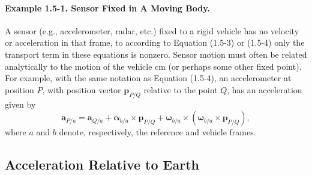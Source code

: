 \paragraph{Example 1.5-1. Sensor Fixed in A Moving Body.} A sensor (e.g., accelerometer, radar, etc.) fixed to a rigid vehicle has no velocity or acceleration in that frame, to according to Equation (1.5-3) or (1.5-4) only the transport term in these equations is nonzero. Sensor motion must often be related analytically to the motion of the vehicle cm (or perhaps some other fixed point). For example, with the same notation as Equation (1.5-4), an accelerometer at position \(P\), with position vector \(\mathbf{p}_{P/Q}\) relative to the point \(Q\), has an acceleration given by
\begin{equation*}
    {\mathbf{a}_{P/a}} = {\mathbf{a}_{Q/a}} + {\mathbf{\alpha}_{b/a}}\!\times\!{\mathbf{p}_{P/Q}} + {\mathbf{\omega}_{b/a}}\!\times\!\left({\mathbf{\omega}_{b/a}}\!\times\!{\mathbf{p}_{P/Q}}\right),
\end{equation*}
where \(a\) and \(b\) denote, respectively, the reference and vehicle frames.

\subsection{Acceleration Relative to Earth}

